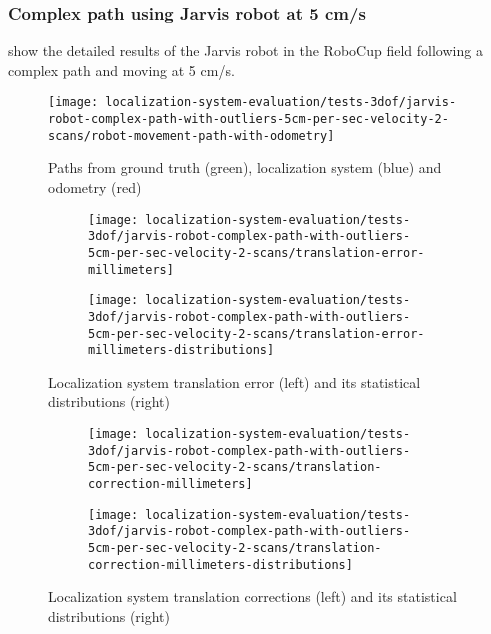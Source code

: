 \subsubsection{Complex path using Jarvis robot at 5 cm/s}

 show the detailed results of the Jarvis robot in the RoboCup field following a complex path and moving at 5 cm/s.

\begin{figure}[H]
	\centering
	\texttt{[image: localization-system-evaluation/tests-3dof/jarvis-robot-complex-path-with-outliers-5cm-per-sec-velocity-2-scans/robot-movement-path-with-odometry]}
	\caption{Paths from ground truth (green), localization system (blue) and odometry (red)}
	\label{fig:localization-system-evaluation_jarvis-robot-complex-path-with-outliers-5cm-per-sec-velocity-2-scans}
\end{figure}

\begin{figure}[H]
	\centering
	\begin{subfigure}[h]{.497\textwidth}
		\centering
		\texttt{[image: localization-system-evaluation/tests-3dof/jarvis-robot-complex-path-with-outliers-5cm-per-sec-velocity-2-scans/translation-error-millimeters]}
	\end{subfigure}
	\begin{subfigure}[h]{.497\textwidth}
		\centering
		\texttt{[image: localization-system-evaluation/tests-3dof/jarvis-robot-complex-path-with-outliers-5cm-per-sec-velocity-2-scans/translation-error-millimeters-distributions]}
	\end{subfigure}
	\caption{Localization system translation error (left) and its statistical distributions (right)}
	\label{fig:localization-system-evaluation_jarvis-robot-complex-path-with-outliers-5cm-per-sec-velocity-2-scans_translation-errors}
\end{figure}

\begin{figure}[H]
	\centering
	\begin{subfigure}[h]{.497\textwidth}
		\centering
		\texttt{[image: localization-system-evaluation/tests-3dof/jarvis-robot-complex-path-with-outliers-5cm-per-sec-velocity-2-scans/translation-correction-millimeters]}
	\end{subfigure}
	\begin{subfigure}[h]{.497\textwidth}
		\centering
		\texttt{[image: localization-system-evaluation/tests-3dof/jarvis-robot-complex-path-with-outliers-5cm-per-sec-velocity-2-scans/translation-correction-millimeters-distributions]}
	\end{subfigure}
	\caption{Localization system translation corrections (left) and its statistical distributions (right)}
	\label{fig:localization-system-evaluation_jarvis-robot-complex-path-with-outliers-5cm-per-sec-velocity-2-scans_translation-errors-corrections}
\end{figure}

